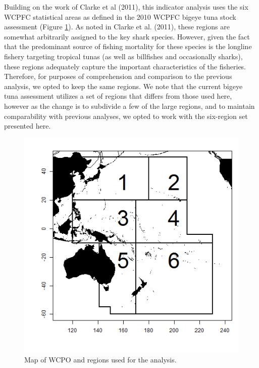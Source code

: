 \documentclass[12pt]{SCreport}
\begin{document}
Building on the work of Clarke et al (2011), this indicator analysis uses the six WCPFC statistical areas as defined in the 2010 WCPFC bigeye tuna stock assessment (Figure \ref{fig:fig01}). As noted in Clarke et al. (2011), these regions are somewhat arbitrarily assigned to the key shark species. However, given the fact that the predominant source of fishing mortality for these species is the longline fishery targeting tropical tunas (as well as billfishes and occasionally sharks), these regions adequately capture the important characteristics of the fisheries. Therefore, for purposes of comprehension and comparison to the previous analysis, we opted to keep the same regions. We note that the current bigeye tuna assessment utilizes a set of regions that differs from those used here, however as the change is to subdivide a few of the large regions, and to maintain comparability with previous analyses, we opted to work with the six-region set presented here.



\begin{figure}
\begin{center}
\includegraphics[scale=0.95]{../GRAPHICS/Defined/FIG_01_MAP}
\caption{\label{fig:fig01} Map of WCPO and regions used for the analysis.}
\end{center}
\end{figure}
\end{document}
